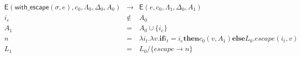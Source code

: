 \documentclass{article}
\begin{document}
\newcommand{\eval}{\mathsf{E}}
\newcommand{\op}[1]{\mathsf{#1}}
\newcommand{\continuation}{c}
\newcommand{\scopestate}{\Lambda}
\newcommand{\dynamicstate}{\Delta}
\newcommand{\ambientstate}{A}

\begin{eqnarray}
\eval(\op{with\_escape}(\sigma, e), \continuation_0, \scopestate_0, \dynamicstate_0, \ambientstate_0) & \to &
\eval(e, \continuation_0, \scopestate_1, \dynamicstate_0, \ambientstate_1) \\
i_e & \notin & A_0 \\
A_1 & = & A_0 \cup \{i_e\} \\
n & = & \lambda i_t.\lambda v. \mathbf{if} i_t = i_e \mathbf{then} c_0(v, A_1) \mathbf{else} L_0.escape(i_t, v) \\
L_1 & = & L_0 / \{escape \to n\}
\end{eqnarray}
\end{document}
